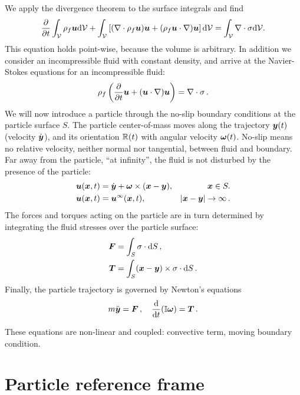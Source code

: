 \documentclass[thesis.tex]{subfiles}
\begin{document}
We apply the divergence theorem to the surface integrals and find
\begin{align}
    \frac{\partial }{\partial t}\int_\mathcal V  \rho_f \mbox{\boldmath$u$} \mathrm{d}\mathcal V +
    \int_\mathcal V  \left[(\nabla\cdot\rho_f\mbox{\boldmath$u$}) \mbox{\boldmath$u$}+(\rho_f\mbox{\boldmath$u$}\cdot\nabla) \mbox{\boldmath$u$}\right] \mathrm{d} \mathcal V =
    \int_\mathcal V \nabla\cdot\mathbb{\sigma} \mathrm{d} \mathcal V.
\end{align}
This equation holds point-wise, because the volume is arbitrary. In addition we consider an incompressible fluid with constant density, and arrive at the Navier-Stokes equations for an incompressible fluid:
\begin{align}
    \rho_f \left(\frac{\partial }{\partial t}\mbox{\boldmath$u$} + (\mbox{\boldmath$u$} \cdot \nabla) \mbox{\boldmath$u$}\right)=\nabla \cdot \mathbb{\sigma}\,.
\end{align}
We will now introduce a particle through the no-slip boundary conditions at the particle surface $S$. The particle center-of-mass moves along the trajectory $\mbox{\boldmath$y$}(t)$ (velocity $\dot{\mbox{\boldmath$y$}}$), and its orientation $\mathbb{R}(t)$ with angular velocity $\mbox{\boldmath$\omega$}(t)$. No-slip means no relative velocity, neither normal nor tangential, between fluid and boundary. Far away from the particle, ``at infinity'', the fluid is not disturbed by the presence of the particle:
\begin{align}
    \mbox{\boldmath$u$}(\mbox{\boldmath$x$}, t) &= \dot{\mbox{\boldmath$y$}} + \mbox{\boldmath$\omega$} \times (\mbox{\boldmath$x$} - \mbox{\boldmath$y$}), & \mbox{\boldmath$x$} \in S. \nonumber\\
    \mbox{\boldmath$u$}(\mbox{\boldmath$x$}, t) &= \mbox{\boldmath$u$}^\infty(\mbox{\boldmath$x$}, t), & |\mbox{\boldmath$x$}-\mbox{\boldmath$y$}|\to\infty\,.
\end{align}
The forces and torques acting on the particle are in turn determined by integrating the fluid stresses over the particle surface:
\begin{align}
    \mbox{\boldmath$F$} &= \int_S \mathbb{\sigma} \cdot \mathrm{d} S\,, \\
    \mbox{\boldmath$T$} &= \int_S (\mbox{\boldmath$x$} - \mbox{\boldmath$y$}) \times \mathbb{\sigma} \cdot \mathrm{d} S\,.
\end{align}
Finally, the particle trajectory is governed by Newton's equations
\begin{align}
    m\ddot{\mbox{\boldmath$y$}} = \mbox{\boldmath$F$}\,, \quad \frac{\mathrm{d} }{\mathrm{d} t}(\mathbb{I} \mbox{\boldmath$\omega$}) = \mbox{\boldmath$T$}\,.
\end{align}

These equations are non-linear and coupled: convective term, moving boundary condition.

\section{Particle reference frame}
\end{document}
